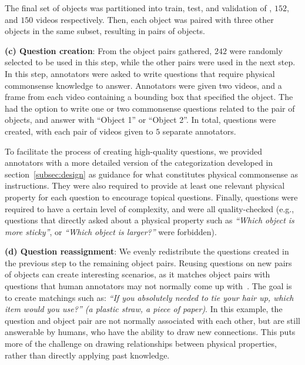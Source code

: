 \documentclass[runningheads]{llncs}
\begin{document}
The final set of  objects was partitioned into train, test, and validation of , $152$, and $150$ videos respectively. Then, each object was paired with three other objects in the same subset, resulting in  pairs of objects. 

\noindent \textbf{(c) Question creation}: From the  object pairs gathered, $242$ were randomly selected to be used in this step, while the other  pairs were used in the next step. In this step, annotators were asked to write questions that require physical commonsense knowledge to answer. Annotators were given two videos, and a frame from each video containing a bounding box that specified the object. The had the option to write one or two commonsense questions related to the pair of objects, and answer with ``Object 1'' or ``Object 2''. In total,  questions were created, with each pair of videos given to $5$ separate annotators. 

To facilitate the process of creating high-quality questions, we provided annotators with a more detailed version of the categorization developed in section~\ref{subsec:design} as guidance for what constitutes physical commonsense as instructions. They were also required to provide at least one relevant physical property
for each question to encourage topical questions. Finally, questions were required to have a certain level of complexity, and were all quality-checked (e.g., questions that directly asked about a physical property such as \textit{``Which object is more sticky''}, or \textit{``Which object is larger?''} were forbidden).

\noindent \textbf{(d) Question reassignment}: We evenly redistribute the  questions created in the previous step to the remaining  object pairs. Reusing questions on new pairs of objects can create interesting scenarios, as it matches object pairs with questions that human annotators may not normally come up with~\cite{bisk2020piqa}. The goal is to create matchings such as: \textit{``If you absolutely needed to tie your hair up, which item would you use?'' (\textcolor{gg}{a plastic straw}, a piece of paper)}. In this example, the question and object pair are not normally associated with each other, but are still answerable by humans, who have the ability to draw new connections. This puts more of the challenge on drawing relationships between physical properties, rather than directly applying past knowledge.
\end{document}
